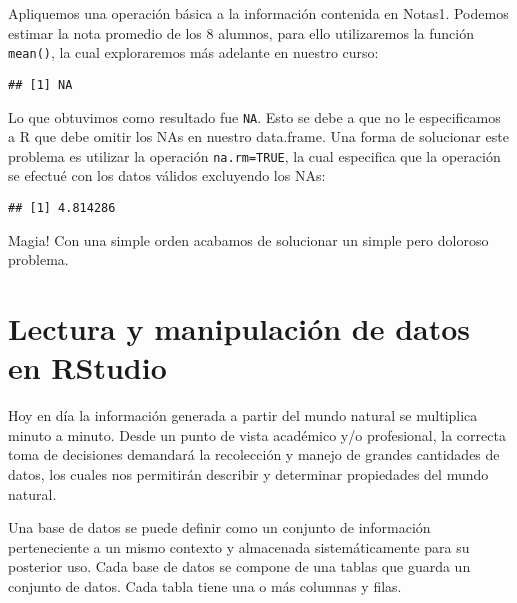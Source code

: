 \documentclass[]{book}
\newenvironment{Shaded}{\begin{snugshade}}{\end{snugshade}}
\newcommand{\DataTypeTok}[1]{\textcolor[rgb]{0.13,0.29,0.53}{#1}}
\newcommand{\KeywordTok}[1]{\textcolor[rgb]{0.13,0.29,0.53}{\textbf{#1}}}
\newcommand{\NormalTok}[1]{#1}
\newcommand{\OperatorTok}[1]{\textcolor[rgb]{0.81,0.36,0.00}{\textbf{#1}}}
\newcommand{\OtherTok}[1]{\textcolor[rgb]{0.56,0.35,0.01}{#1}}
\begin{document}
Apliquemos una operación básica a la información contenida en Notas1. Podemos estimar la nota promedio
de los 8 alumnos, para ello utilizaremos la función \texttt{mean()}, la cual exploraremos más adelante en nuestro
curso:

\begin{Shaded}
\end{Shaded}

\begin{verbatim}
## [1] NA
\end{verbatim}

Lo que obtuvimos como resultado fue \texttt{NA}. Esto se debe a que no le especificamos a R que debe omitir los
NAs en nuestro data.frame. Una forma de solucionar este problema es utilizar la operación \texttt{na.rm=TRUE}, la
cual especifica que la operación se efectué con los datos válidos excluyendo los NAs:

\begin{Shaded}
\end{Shaded}

\begin{verbatim}
## [1] 4.814286
\end{verbatim}

Magia! Con una simple orden acabamos de solucionar un simple pero doloroso problema.

\hypertarget{lectura-y-manipulacion-de-datos-en-rstudio}{%
\chapter{Lectura y manipulación de datos en RStudio}\label{lectura-y-manipulacion-de-datos-en-rstudio}}

Hoy en día la información generada a partir del mundo natural se multiplica minuto a minuto. Desde un punto de vista académico y/o profesional, la correcta toma de decisiones demandará la recolección y manejo de grandes cantidades de datos, los cuales nos permitirán describir y determinar propiedades del mundo natural.

Una base de datos se puede definir como un conjunto de información perteneciente a un mismo contexto y almacenada sistemáticamente para su posterior uso. Cada base de datos se compone de una tablas que guarda un conjunto de datos. Cada tabla tiene una o más columnas y filas.
\end{document}

